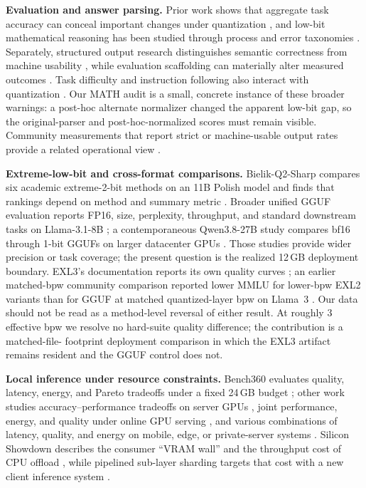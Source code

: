 \documentclass[11pt]{article}
\begin{document}
\textbf{Evaluation and answer parsing.} Prior work shows that aggregate task accuracy
can conceal important changes under quantization \citep{dutta2024accuracy},
and low-bit mathematical reasoning has been studied through process and error
taxonomies \citep{quantreasoning2025,extremelowbit2026}. Separately, structured
output research distinguishes semantic correctness from machine usability
\citep{correctnotusable2026}, while evaluation scaffolding can materially alter
measured outcomes \citep{scaffolding2026}. Task difficulty and instruction
following also interact with quantization \citep{quantinstruct2024}. Our
MATH audit is a small, concrete instance of these broader warnings: a
post-hoc alternate normalizer changed the apparent low-bit gap, so the
original-parser and post-hoc-normalized scores must remain visible. Community measurements that report strict or
machine-usable output rates provide a related operational view
\citep{strix2026}.

\textbf{Extreme-low-bit and cross-format comparisons.} Bielik-Q2-Sharp
compares six academic extreme-2-bit methods on an 11B Polish model and finds
that rankings depend on method and summary metric \citep{bielik2026q2sharp}.
Broader unified GGUF evaluation reports FP16, size, perplexity, throughput, and
standard downstream tasks on Llama-3.1-8B \citep{kurt2026whichquant}; a
contemporaneous Qwen3.8-27B study compares bf16 through 1-bit GGUFs on larger
datacenter GPUs \citep{migdal2026qwen38}. Those studies provide wider precision
or task coverage; the present question is the realized 12\,GB deployment
boundary.
EXL3's documentation reports its own quality curves
\citep{turboderp2025exllamav3}; an earlier matched-bpw community comparison
reported lower MMLU for lower-bpw EXL2 variants than for GGUF at matched
quantized-layer bpw on Llama~3 \citep{mattc1llama3}. Our data should not be
read as a method-level reversal of either result. At roughly 3 effective bpw we
resolve no hard-suite quality difference; the contribution is a matched-file-
footprint deployment comparison in which the EXL3 artifact remains resident
and the GGUF control does not.

\textbf{Local inference under resource constraints.} Bench360 evaluates
quality, latency, energy, and Pareto tradeoffs under a fixed 24\,GB budget
\citep{bench360}; other work studies accuracy--performance tradeoffs on server
GPUs \citep{kurtic2024bf16}, joint performance, energy, and quality under
online GPU serving \citep{qmeter2025}, and various combinations of latency,
quality, and energy on mobile, edge, or private-server systems
\citep{sustainableedge2025,palmbench2024,privateserver2025}. Silicon Showdown describes the consumer ``VRAM wall'' and
the throughput cost of CPU offload \citep{javat2026siliconshowdown}, while
pipelined sub-layer sharding targets that cost with a new client inference
system \citep{ukarande2026vram}.
\end{document}
